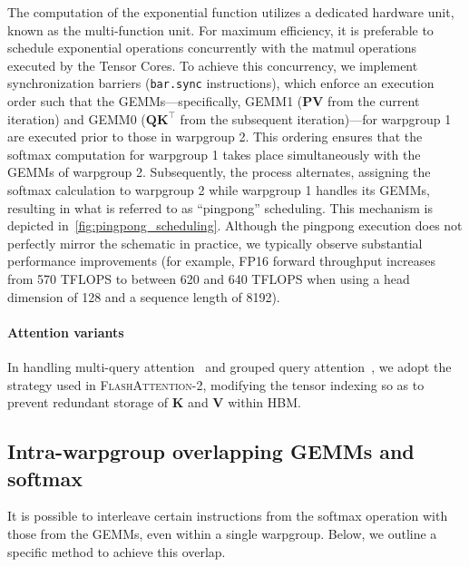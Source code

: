 \begin{enumerate}
The computation of the exponential function utilizes a dedicated hardware unit, known as the multi-function unit. For maximum efficiency, it is preferable to schedule exponential operations concurrently with the matmul operations executed by the Tensor Cores. To achieve this concurrency, we implement synchronization barriers (\texttt{bar.sync} instructions), which enforce an execution order such that the GEMMs—specifically, GEMM1 (\(\mathbf{P} \mathbf{V}\) from the current iteration) and GEMM0 (\(\mathbf{Q} \mathbf{K}^\top\) from the subsequent iteration)—for warpgroup 1 are executed prior to those in warpgroup 2. This ordering ensures that the softmax computation for warpgroup 1 takes place simultaneously with the GEMMs of warpgroup 2. Subsequently, the process alternates, assigning the softmax calculation to warpgroup 2 while warpgroup 1 handles its GEMMs, resulting in what is referred to as “pingpong” scheduling. This mechanism is depicted in~\cref{fig:pingpong_scheduling}. Although the pingpong execution does not perfectly mirror the schematic in practice, we typically observe substantial performance improvements (for example, FP16 forward throughput increases from 570 TFLOPS to between 620 and 640 TFLOPS when using a head dimension of 128 and a sequence length of 8192).

\paragraph{Attention variants} In handling multi-query attention~\citep{shazeer2019fast} and grouped query attention~\citep{ainslie2023gqa}, we adopt the strategy used in \textsc{FlashAttention-2}, modifying the tensor indexing so as to prevent redundant storage of $\mathbf{K}$ and $\mathbf{V}$ within HBM.

\subsection{Intra-warpgroup overlapping GEMMs and softmax}

It is possible to interleave certain instructions from the softmax operation with those from the GEMMs, even within a single warpgroup. Below, we outline a specific method to achieve this overlap.


\end{enumerate}
